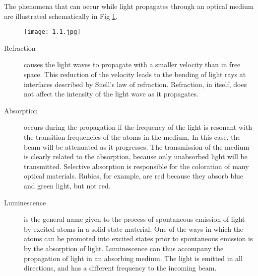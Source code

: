 \documentclass[12pt]{book}
\begin{document}
The phenomena that can occur while light propagates through an optical medium are illustrated schematically in Fig \ref{fig:sche}.

\begin{figure}[http]
\begin{center}\label{fig:sche}
\texttt{[image: 1.1.jpg]}
\end{center}
\end{figure}
\vspace{-3\baselineskip}


\vspace{2\baselineskip}
\begin{description}
\item[Refraction] causes the light waves to propagate with a smaller velocity than in free space. This reduction of the velocity leads to the bending of light rays at interfaces described by Snell's law of refraction. Refraction, in itself, does not affect the intensity of the light wave as it propagates.
\item[Absorption] occurs during the propagation if the frequency of the light is resonant  with the transition frequencies of the atoms in the medium. In this case, the beam will be attenuated as it progresses. The transmission of the medium is clearly related to the absorption, because only unabsorbed light will be transmitted. Selective absorption is responsible for the coloration of many optical materials. Rubies, for example, are red because they absorb blue and green light, but not red.
\item[Luminescence] is  the general name given to the process of spontaneous emission of light by excited atoms in a solid state material. One of the ways in which the atoms can be promoted into excited states prior to spontaneous emission is by the absorption of light. Luminescence can thus accompany the propagation of light in an absorbing medium. The light is emitted in all directions, and has a different frequency to the incoming beam.


\end{description}
\end{document}
